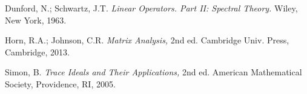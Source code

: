 \documentclass[11pt]{nyjm}
\numberwithin{equation}{section}
\begin{document}
\begin{thebibliography}

 Dunford, N.; Schwartz, J.T. \textit{Linear Operators. Part II: Spectral Theory.}   Wiley, New York, 1963.
 
 Horn, R.A.; Johnson, C.R. \textit{Matrix Analysis,} 2nd ed.   Cambridge Univ. Press, Cambridge, 2013.
 
 Simon, B. \textit{Trace Ideals and Their Applications,} 2nd ed.    American Mathematical Society, Providence, RI, 2005.
\end{thebibliography}
\end{document}
